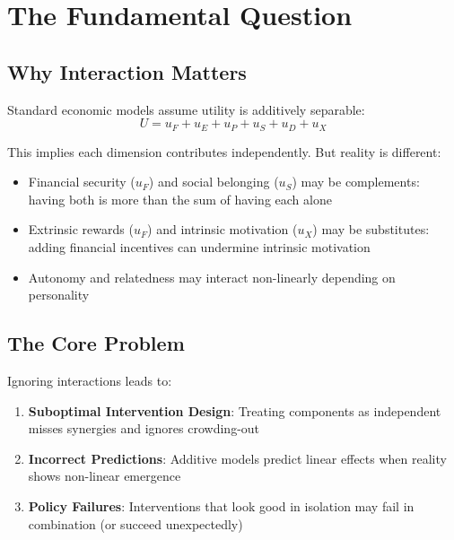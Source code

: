 \section{The Fundamental Question}
\label{sec:how-fundamental}

\subsection{Why Interaction Matters}

Standard economic models assume utility is additively separable:
\begin{equation}
U = u_F + u_E + u_P + u_S + u_D + u_X
\end{equation}

This implies each dimension contributes independently. But reality is different:

\begin{itemize}
\item Financial security ($u_F$) and social belonging ($u_S$) may be complements:
      having both is more than the sum of having each alone
\item Extrinsic rewards ($u_F$) and intrinsic motivation ($u_X$) may be substitutes:
      adding financial incentives can undermine intrinsic motivation
\item Autonomy and relatedness may interact non-linearly depending on personality
\end{itemize}

\subsection{The Core Problem}

Ignoring interactions leads to:
\begin{enumerate}
\item \textbf{Suboptimal Intervention Design}: Treating components as independent
      misses synergies and ignores crowding-out
\item \textbf{Incorrect Predictions}: Additive models predict linear effects
      when reality shows non-linear emergence
\item \textbf{Policy Failures}: Interventions that look good in isolation
      may fail in combination (or succeed unexpectedly)
\end{enumerate}

